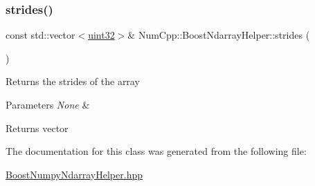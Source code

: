 \subsubsection{\texorpdfstring{strides()}{strides()}}
{\footnotesize\ttfamily const std\+::vector$<$\mbox{\hyperlink{namespace_num_cpp_a36f388e948380413c63011cab9b7fbd5}{uint32}}$>$\& Num\+Cpp\+::\+Boost\+Ndarray\+Helper\+::strides (\begin{DoxyParamCaption}{ }\end{DoxyParamCaption})\hspace{0.3cm}{\ttfamily [inline]}}

Returns the strides of the array


\begin{DoxyParams}{Parameters}
{\em None} & \\
\hline
\end{DoxyParams}
\begin{DoxyReturn}{Returns}
vector 
\end{DoxyReturn}


The documentation for this class was generated from the following file\+:\begin{DoxyCompactItemize}
\item 
\mbox{\hyperlink{_boost_numpy_ndarray_helper_8hpp}{Boost\+Numpy\+Ndarray\+Helper.\+hpp}}\end{DoxyCompactItemize}
